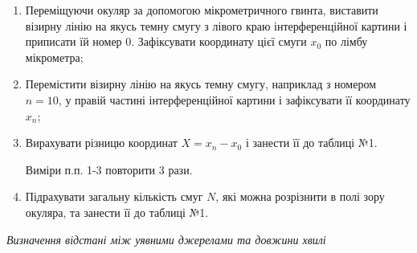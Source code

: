 \documentclass[12pt,a4paper]{article}
\begin{document}
    \begin{enumerate}
        \item Переміщуючи окуляр за допомогою мікрометричного гвинта, виставити візирну
        лінію на якусь темну смугу з лівого краю інтерференційної картини і приписати
        їй номер 0. Зафіксувати координату цієї смуги $x_0$ по лімбу мікрометра;

        \item Перемістити візирну лінію на якусь темну смугу, наприклад з номером
        $n = 10$, у правій частині інтерференційної картини і зафіксувати її координату $x_n$;

        \item Вирахувати різницю координат $X = x_n - x_0$ і занести її до таблиці №1.
        
        Виміри п.п. 1-3 повторити 3 рази.

        \item Підрахувати загальну кількість смуг $N$, які можна розрізнити в полі
        зору окуляра, та занести її до таблиці №1.

    \end{enumerate}

    \begin{center} \textit{Визначення відстані між уявними джерелами та довжини хвилі} \end{center}
\end{document}
